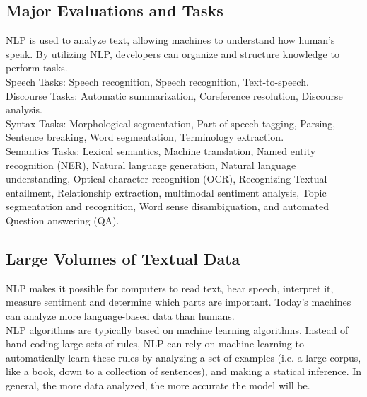 \subsection{Major Evaluations and Tasks}
NLP is used to analyze text, allowing machines to understand how human’s speak.
By utilizing NLP, developers can organize and structure knowledge to perform tasks.\\
Speech Tasks: Speech recognition, Speech recognition, Text-to-speech.\\
Discourse Tasks: Automatic summarization, Coreference resolution, Discourse analysis.\\
Syntax Tasks: Morphological segmentation, Part-of-speech tagging, Parsing, Sentence breaking, Word segmentation, Terminology extraction.\\
Semantics Tasks: Lexical semantics, Machine translation, Named entity recognition (NER), Natural language generation, Natural language understanding, Optical character recognition (OCR), Recognizing Textual entailment, Relationship extraction, multimodal sentiment analysis, Topic segmentation and recognition, Word sense disambiguation, and automated Question answering (QA).
\subsection{Large Volumes of Textual Data}
NLP makes it possible for computers to read text, hear speech, interpret it, measure sentiment and determine which parts are important. Today’s machines can analyze more language-based data than humans.\\NLP algorithms are typically based on machine learning algorithms. Instead of hand-coding large sets of rules, NLP can rely on machine learning to automatically learn these rules by analyzing a set of examples (i.e. a large corpus, like a book, down to a collection of sentences), and making a statical inference. In general, the more data analyzed, the more accurate the model will be.
